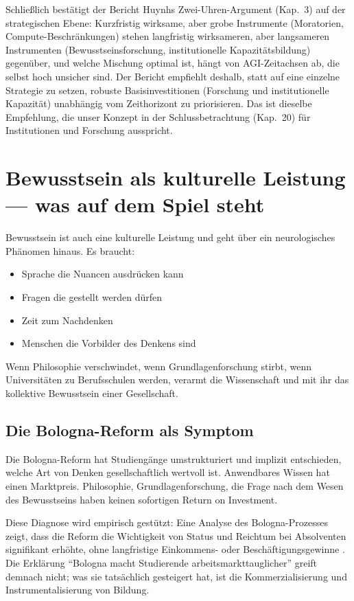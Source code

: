 \documentclass[acmlarge, noacm]{acmart}
\begin{document}
Schließlich bestätigt der Bericht Huynhs Zwei-Uhren-Argument (Kap.~3) auf der strategischen Ebene: Kurzfristig wirksame, aber grobe Instrumente (Moratorien, Compute-Beschränkungen) stehen langfristig wirksameren, aber langsameren Instrumenten (Bewusstseinsforschung, institutionelle Kapazitätsbildung) gegenüber, und welche Mischung optimal ist, hängt von AGI-Zeitachsen ab, die selbst hoch unsicher sind. Der Bericht empfiehlt deshalb, statt auf eine einzelne Strategie zu setzen, robuste Basisinvestitionen (Forschung und institutionelle Kapazität) unabhängig vom Zeithorizont zu priorisieren. Das ist dieselbe Empfehlung, die unser Konzept in der Schlussbetrachtung (Kap.~20) für Institutionen und Forschung ausspricht.

\section{Bewusstsein als kulturelle Leistung --- was auf dem Spiel steht}

Bewusstsein ist auch eine kulturelle Leistung und geht über ein neurologisches Phänomen hinaus. Es braucht:

\begin{itemize}
\item Sprache die Nuancen ausdrücken kann
\item Fragen die gestellt werden dürfen
\item Zeit zum Nachdenken
\item Menschen die Vorbilder des Denkens sind
\end{itemize}

Wenn Philosophie verschwindet, wenn Grundlagenforschung stirbt, wenn Universitäten zu Berufsschulen werden, verarmt die Wissenschaft und mit ihr das kollektive Bewusstsein einer Gesellschaft.

\subsection{Die Bologna-Reform als Symptom}

Die Bologna-Reform hat Studiengänge umstrukturiert und implizit entschieden, welche Art von Denken gesellschaftlich wertvoll ist. Anwendbares Wissen hat einen Marktpreis. Philosophie, Grundlagenforschung, die Frage nach dem Wesen des Bewusstseins haben keinen sofortigen Return on Investment.

Diese Diagnose wird empirisch gestützt: Eine Analyse des Bologna-Prozesses zeigt, dass die Reform die Wichtigkeit von Status und Reichtum bei Absolventen signifikant erhöhte, ohne langfristige Einkommens- oder Beschäftigungsgewinne \cite{giani2025}. Die Erklärung ``Bologna macht Studierende arbeitsmarkttauglicher'' greift demnach nicht; was sie tatsächlich gesteigert hat, ist die Kommerzialisierung und Instrumentalisierung von Bildung.
\end{document}
